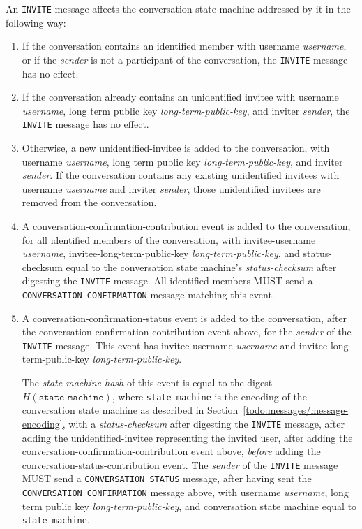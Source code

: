 \documentclass{article}
\def\message#1{\texttt{#1}}
\def\field#1{\textit{#1}}
\def\smfield#1{\textsl{#1}}
\def\type#1{\textsf{#1}}
\begin{document}
An \message{INVITE} message affects the conversation state machine addressed by it in the following way:
\begin{enumerate}
\item If the conversation contains an identified member with username \field{username}, or if the \field{sender} is not a participant of the conversation, the \message{INVITE} message has no effect.
\item If the conversation already contains an unidentified invitee with username \field{username}, long term public key \field{long-term-public-key}, and inviter \field{sender}, the \message{INVITE} message has no effect.
\item Otherwise, a new \type{unidentified-invitee} is added to the conversation, with username \field{username}, long term public key \field{long-term-public-key}, and inviter \field{sender}. If the conversation contains any existing unidentified invitees with username \field{username} and inviter \field{sender}, those unidentified invitees are removed from the conversation.
\item A \type{conversation-confirmation-contribution} event is added to the conversation, for all identified members of the conversation, with invitee-username \field{username}, invitee-long-term-public-key \field{long-term-public-key}, and status-checksum equal to the conversation state machine's \smfield{status-checksum} after digesting the \message{INVITE} message. All identified members MUST send a \message{CONVERSATION\_CONFIRMATION} message matching this event.
\item A \type{conversation-confirmation-status} event is added to the conversation, after the \type{conversation-confirmation-contribution} event above, for the \field{sender} of the \message{INVITE} message. This event has invitee-username \field{username} and invitee-long-term-public-key \field{long-term-public-key}.

The \smfield{state-machine-hash} of this event is equal to the digest $H(\texttt{state-machine})$, where \texttt{state-machine} is the encoding of the conversation state machine as described in Section~\ref{todo:messages/message-encoding}, with a \smfield{status-checksum} after digesting the \message{INVITE} message, after adding the \type{unidentified-invitee} representing the invited user, after adding the \type{conversation-confirmation-contribution} event above, \emph{before} adding the \type{conversation-status-contribution} event.
The \field{sender} of the \message{INVITE} message MUST send a \message{CONVERSATION\_STATUS} message, after having sent the \message{CONVERSATION\_CONFIRMATION} message above, with username \field{username}, long term public key \field{long-term-public-key}, and conversation state machine equal to \texttt{state-machine}.
\label{item:messages/invite/conversation-status-event}
\end{enumerate}
\end{document}
